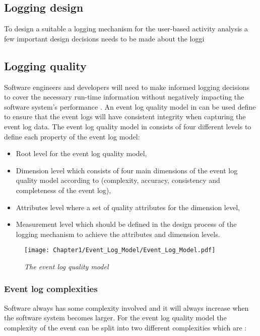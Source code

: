 \clearpage

\subsection{Logging design}
To design a suitable a logging mechanism for the user-based activity analysis a few important design decisions needs to be made about the loggi

\subsection{Logging quality}\label{sec:ch1_loggingQuality}

Software engineers and developers will need to make informed logging decisions to cover the necessary run-time information without negatively impacting the software system's performance \cite{Zhu2015, Zhu2019, Kherbouche2017}. An event log quality model in  can be used define to ensure that the event logs will have consistent integrity when capturing the event log data. The event log quality model in  consists of four different levels to define each property of the event log model:

\begin{itemize}
	\item Root level for the event log quality model,
	\item Dimension level which consists of four main dimensions of the event log quality model according to \cite{Kherbouche2017} (complexity, accuracy, consistency and completeness of the event log),
	\item Attributes level where a set of quality attributes for the dimension level,
	\item Measurement level which should be defined in the design process of the logging mechanism to achieve the attributes and dimension levels.
\end{itemize}

\begin{figure}[!htb] %
	\centering %
	\texttt{[image: Chapter1/Event\_Log\_Model/Event\_Log\_Model.pdf]}
	\caption[The event log quality model]
	{\textit{The event log quality model \cite{Kherbouche2017}}} \label{fig:EventQModel}
\end{figure}

\subsubsection{Event log complexities}
Software always has some complexity involved and it will always increase when the software system becomes larger. For the event log quality model the complexity of the event can be split into two different complexities which are \cite{Kherbouche2017}:

